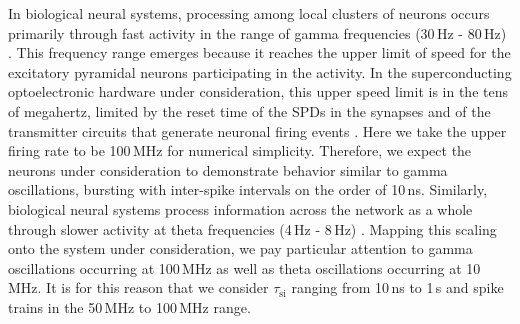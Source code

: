 \documentclass[twocolumn]{article}
\begin{document}
In biological neural systems, processing among local clusters of neurons occurs primarily through fast activity in the range of gamma frequencies (30\,Hz - 80\,Hz) \cite{budr2004,bu2006}. This frequency range emerges because it reaches the upper limit of speed for the excitatory pyramidal neurons participating in the activity. In the superconducting optoelectronic hardware under consideration, this upper speed limit is in the tens of megahertz, limited by the reset time of the SPDs in the synapses and of the transmitter circuits that generate neuronal firing events \cite{sh2018_full}. Here we take the upper firing rate to be 100\,MHz for numerical simplicity. Therefore, we expect the neurons under consideration to demonstrate behavior similar to gamma oscillations, bursting with inter-spike intervals on the order of 10\,ns. Similarly, biological neural systems process information across the network as a whole through slower activity at theta frequencies (4\,Hz - 8\,Hz) \cite{budr2004,bu2006}. Mapping this scaling onto the system under consideration, we pay particular attention to gamma oscillations occurring at 100\,MHz as well as theta oscillations occurring at 10\,MHz. It is for this reason that we consider $\tau_{\mathrm{si}}$ ranging from 10\,ns to 1\,\textmu s and spike trains in the 50\,MHz to 100\,MHz range. 
\end{document}
